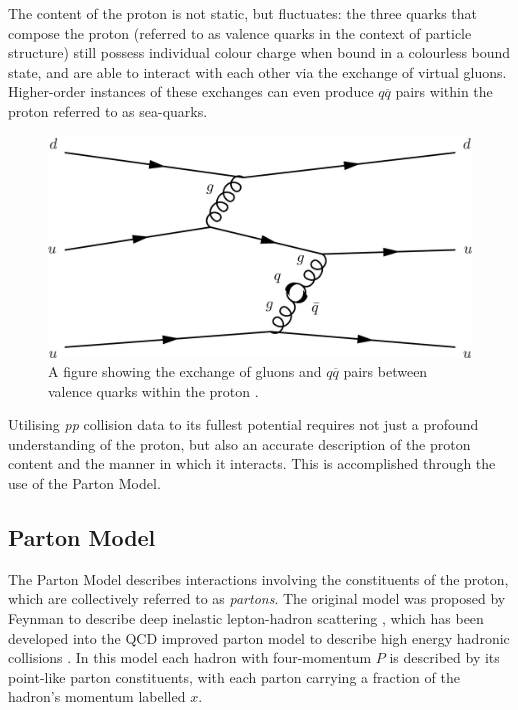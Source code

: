 \documentclass[12pt,a4paper,epsf,portrait,times,epsfig]{report}
\begin{document}
	The content of the proton is not static, but fluctuates: the three quarks that compose the proton (referred to as valence quarks in the context of particle structure) still possess individual colour charge when bound in a colourless bound state, and are able to interact with each other via the exchange of virtual gluons. Higher-order instances of these exchanges can even produce $q\overline{q}$ pairs within the proton referred to as sea-quarks. 

	\begin{figure}[ht]
		\centering
		\includegraphics[scale=0.25]{Sea-quarks.png}
		\caption{A figure showing the exchange of gluons and $q\overline{q}$ pairs between valence quarks within the proton \cite{thomson_2013}.}
		\label{Fig:SeaQuarks} 
	\end{figure}

	Utilising \textit{pp} collision data to its fullest potential requires not just a profound understanding of the proton, but also an accurate description of the proton content and the manner in which it interacts. This is accomplished through the use of the Parton Model. \par

	\subsection{Parton Model}

	The Parton Model describes interactions involving the constituents of the proton, which are collectively referred to as \textit{partons}. The original model was proposed by Feynman to describe deep inelastic lepton-hadron scattering \cite{PartonModelFeynman}, which has been developed into the QCD improved parton model to describe high energy hadronic collisions \cite{PartonModelQCD}. In this model each hadron with four-momentum $P$ is described by its point-like parton constituents, with each parton carrying a fraction of the hadron's momentum labelled $x$. \par
	
\end{document}
